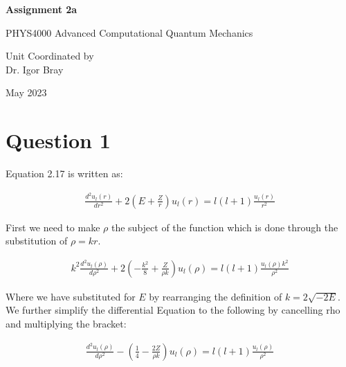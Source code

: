 \documentclass{article}
\begin{document}
\newpage
\begin{center}
       
       \vspace*{1cm}
        \LARGE
       \textbf{Assignment 2a}

       \vspace{0.5cm}
        PHYS4000
        Advanced Computational Quantum Mechanics
            
       \vspace{1.5cm}

       \bigskip

       Unit Coordinated by\\
       Dr. Igor Bray
            
       \vspace{0.8cm}
     
            
       
       May 2023
            
\end{center}
\newpage



\section{Question 1}

Equation 2.17 is written as:

    \begin{gather}
        \frac{d^2u_l(r)}{dr^2} + 2(E+\frac{Z}{r}) u_l(r) = l(l+1)\frac{u_l(r)}{r^2}
    \end{gather}

    First we need to make $\rho$ the subject of the function which is done through the substitution of
    $\rho=kr$.

    \begin{gather}
        k^2 \frac{d^2u_l(\rho)}{d\rho^2} + 2(-\frac{k^2}{8}+\frac{Z}{\rho k})u_l(\rho) =  l(l+1)\frac{u_l(\rho)k^2}{\rho^2}
    \end{gather}

    Where we have substituted for $E$ by rearranging the definition of $k=2\sqrt{-2E}$. 
    We further simplify the differential Equation to the following by cancelling rho and multiplying the bracket:

    \begin{gather}
        \frac{d^2u_l(\rho)}{d\rho^2} - (\frac{1}{4}-\frac{2Z}{\rho k})u_l(\rho) =  l(l+1)\frac{u_l(\rho)}{\rho^2}
    \end{gather}
\end{document}

